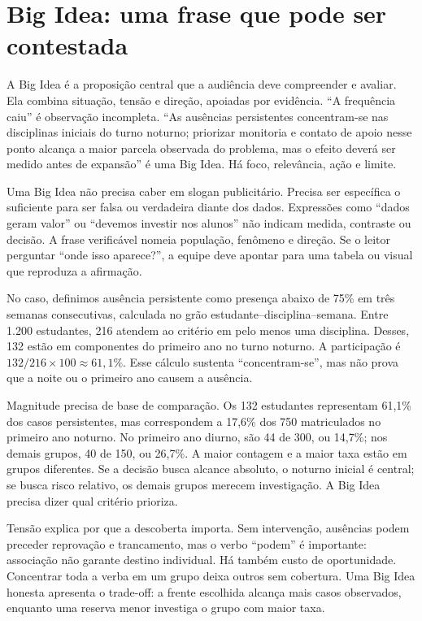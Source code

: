 \section{Big Idea: uma frase que pode ser contestada}

A Big Idea é a proposição central que a audiência deve compreender e avaliar. Ela combina situação, tensão e direção, apoiadas por evidência. ``A frequência caiu'' é observação incompleta. ``As ausências persistentes concentram-se nas disciplinas iniciais do turno noturno; priorizar monitoria e contato de apoio nesse ponto alcança a maior parcela observada do problema, mas o efeito deverá ser medido antes de expansão'' é uma Big Idea. Há foco, relevância, ação e limite.

Uma Big Idea não precisa caber em slogan publicitário. Precisa ser específica o suficiente para ser falsa ou verdadeira diante dos dados. Expressões como ``dados geram valor'' ou ``devemos investir nos alunos'' não indicam medida, contraste ou decisão. A frase verificável nomeia população, fenômeno e direção. Se o leitor perguntar ``onde isso aparece?'', a equipe deve apontar para uma tabela ou visual que reproduza a afirmação.

No caso, definimos ausência persistente como presença abaixo de 75\% em três semanas consecutivas, calculada no grão estudante--disciplina--semana. Entre 1.200 estudantes, 216 atendem ao critério em pelo menos uma disciplina. Desses, 132 estão em componentes do primeiro ano no turno noturno. A participação é $132/216\times100\approx61{,}1\%$. Esse cálculo sustenta ``concentram-se'', mas não prova que a noite ou o primeiro ano causem a ausência.

Magnitude precisa de base de comparação. Os 132 estudantes representam 61,1\% dos casos persistentes, mas correspondem a 17,6\% dos 750 matriculados no primeiro ano noturno. No primeiro ano diurno, são 44 de 300, ou 14,7\%; nos demais grupos, 40 de 150, ou 26,7\%. A maior contagem e a maior taxa estão em grupos diferentes. Se a decisão busca alcance absoluto, o noturno inicial é central; se busca risco relativo, os demais grupos merecem investigação. A Big Idea precisa dizer qual critério prioriza.

Tensão explica por que a descoberta importa. Sem intervenção, ausências podem preceder reprovação e trancamento, mas o verbo ``podem'' é importante: associação não garante destino individual. Há também custo de oportunidade. Concentrar toda a verba em um grupo deixa outros sem cobertura. Uma Big Idea honesta apresenta o trade-off: a frente escolhida alcança mais casos observados, enquanto uma reserva menor investiga o grupo com maior taxa.

